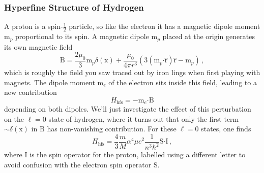 \documentclass{article}
\theoremstyle{plain}\theoremheaderfont{\normalfont\itshape}\theorembodyfont{\rmfamily}\theoremseparator{.}\newtheorem*{rem}{Remark}\newtheorem*{ex}{Example}\newtheorem*{proof}{Proof}\newtheorem*{altp}{Alternative proof}
\theoremstyle{plain}\theoremheaderfont{\normalfont\bfseries}\theorembodyfont{\rmfamily}\theoremseparator{.}\newtheorem{thm}{Theorem}[section]\newtheorem{lem}[thm]{Lemma}\newtheorem{prop}[thm]{Proposition}\newtheorem*{cor}{Corollary}\newtheorem{defn}[thm]{Definition}\newtheorem{clm}[thm]{Claim}\newtheorem{clminproof}{Claim}
\theoremstyle{break}\theoremheaderfont{\normalfont\itshape}\theorembodyfont{\rmfamily}\theoremseparator{.\medskip}\newtheorem*{proofskip}{Proof}\newtheorem*{exs}{Examples}\newtheorem*{rems}{Remarks}
\theoremstyle{break}\theoremheaderfont{\normalfont\bfseries}\theorembodyfont{\rmfamily}\theoremseparator{.\medskip}\newtheorem{lemskip}[thm]{Lemma}\newtheorem{defnskip}[thm]{Definition}\newtheorem{propskip}[thm]{Proposition}\newtheorem{thmskip}[thm]{Theorem}
\numberwithin{equation}{section}
\newcommand{\vb}[1]{\bm{\mathrm{#1}}}
\newcommand{\vu}[1]{\hat{\bm{\mathrm{#1}}}}
\newcommand{\vdot}{\bm{\cdot}}
\begin{document}
    \subsubsection{Hyperfine Structure of Hydrogen}
    A proton is a spin-\(\frac{1}{2}\) particle, so like the electron it has a magnetic dipole moment \(\vb{m}_p\) proportional to its spin. A magnetic dipole \(\vb{m}_p\) placed at the origin generates its own magnetic field
    \begin{equation}
        \vb{B}=\frac{2\mu_0}{3}\vb{m}_p\delta(\vb{x})+\frac{\mu_0}{4\pi r^3}(3(\vb{m}_p\vdot\vu{r})\vu{r}-\vb{m}_p)\,,
    \end{equation}
    which is roughly the field you saw traced out by iron lings when first playing with magnets. The dipole moment \(\vb{m}_e\) of the electron sits inside this field, leading to a new contribution
    \begin{equation}
        H_{\text{hfs}}=-\vb{m}_e\vdot\vb{B}
    \end{equation}
    depending on both dipoles. We'll just investigate the effect of this perturbation on the \(\ell=0\) state of hydrogen, where it turns out that only the first term \(\sim\delta(\vb{x})\) in \(\vb{B}\) has non-vanishing contribution. For these \(\ell=0\) states, one finds
    \begin{equation}\label{hyper_fine_hamiltonian}
        H_{\text{hfs}}=\frac{4}{3}\frac{m}{M}\alpha^4\mu c^2\frac{1}{n^3\hbar^2}\vb{S}\vdot\vb{I}\,,
    \end{equation}
    where \(\vb{I}\) is the spin operator for the proton, labelled using a different letter to avoid confusion with the electron spin operator \(\vb{S}\).
\end{document}
